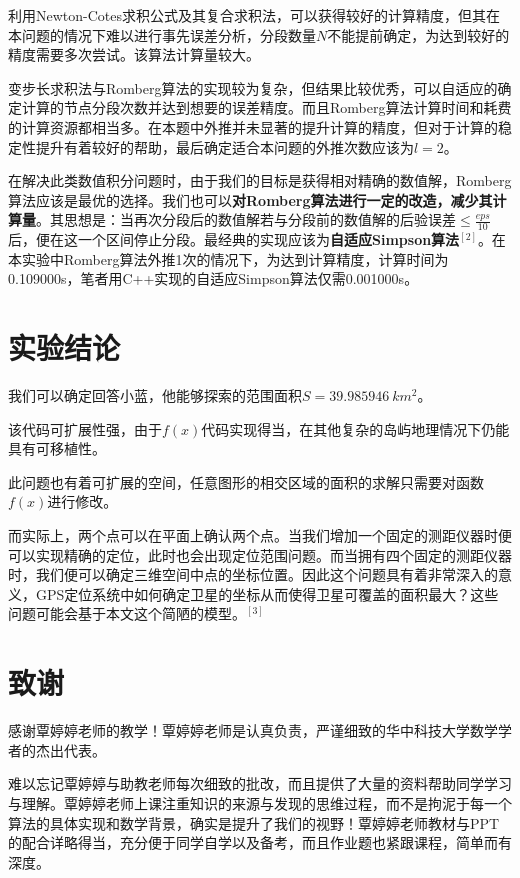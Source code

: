 \documentclass[UTF8]{ctexart}
\begin{document}
	利用Newton-Cotes求积公式及其复合求积法，可以获得较好的计算精度，但其在本问题的情况下难以进行事先误差分析，分段数量$N$不能提前确定，为达到较好的精度需要多次尝试。该算法计算量较大。
	
	变步长求积法与Romberg算法的实现较为复杂，但结果比较优秀，可以自适应的确定计算的节点分段次数并达到想要的误差精度。而且Romberg算法计算时间和耗费的计算资源都相当多。在本题中外推并未显著的提升计算的精度，但对于计算的稳定性提升有着较好的帮助，最后确定适合本问题的外推次数应该为$l = 2$。
	
	在解决此类数值积分问题时，由于我们的目标是获得相对精确的数值解，Romberg算法应该是最优的选择。我们也可以\textbf{对Romberg算法进行一定的改造，减少其计算量}。其思想是：当再次分段后的数值解若与分段前的数值解的后验误差$\leq \frac{eps}{10}$后，便在这一个区间停止分段。最经典的实现应该为\textbf{自适应Simpson算法}${}^{[2]}$。在本实验中Romberg算法外推1次的情况下，为达到计算精度，计算时间为0.109000s，笔者用C++实现的自适应Simpson算法仅需0.001000s。
	
	\newpage
	
	\section{实验结论}
	
	我们可以确定回答小蓝，他能够探索的范围面积$S = 39.985946\ km^2$。
	
	该代码可扩展性强，由于$f(x)$代码实现得当，在其他复杂的岛屿地理情况下仍能具有可移植性。
	
	此问题也有着可扩展的空间，任意图形的相交区域的面积的求解只需要对函数$f(x)$进行修改。
	
	而实际上，两个点可以在平面上确认两个点。当我们增加一个固定的测距仪器时便可以实现精确的定位，此时也会出现定位范围问题。而当拥有四个固定的测距仪器时，我们便可以确定三维空间中点的坐标位置。因此这个问题具有着非常深入的意义，GPS定位系统中如何确定卫星的坐标从而使得卫星可覆盖的面积最大？这些问题可能会基于本文这个简陋的模型。${}^{[3]}$
	
	\section{致谢}
	感谢覃婷婷老师的教学！覃婷婷老师是认真负责，严谨细致的华中科技大学数学学者的杰出代表。
	
	难以忘记覃婷婷与助教老师每次细致的批改，而且提供了大量的资料帮助同学学习与理解。覃婷婷老师上课注重知识的来源与发现的思维过程，而不是拘泥于每一个算法的具体实现和数学背景，确实是提升了我们的视野！覃婷婷老师教材与PPT的配合详略得当，充分便于同学自学以及备考，而且作业题也紧跟课程，简单而有深度。
\end{document}
